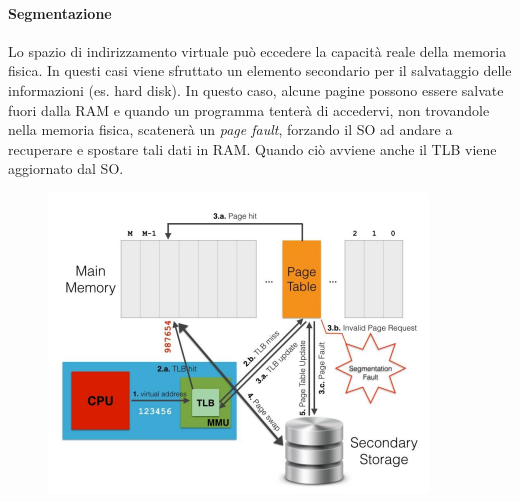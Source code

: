 \documentclass{article}
\begin{document}
\paragraph{Segmentazione}
Lo spazio di indirizzamento virtuale può eccedere la capacità reale della memoria fisica. In questi casi viene sfruttato un elemento secondario per il salvataggio delle informazioni (es. hard disk).
In questo caso, alcune pagine possono essere salvate fuori dalla RAM e quando un programma tenterà di accedervi, non trovandole nella memoria fisica, scatenerà un \textit{page fault}, forzando il SO ad andare a recuperare e spostare tali dati in RAM.
Quando ciò avviene anche il TLB viene aggiornato dal SO.
\begin{figure}[H]
    \centering
    \includegraphics[scale=0.8]{img/Virt_tech/7.png}
    \caption{}
\end{figure}\noindent
\end{document}
